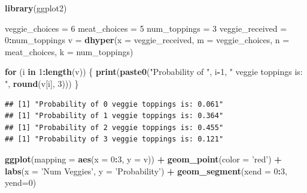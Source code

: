 \documentclass[]{book}
\newenvironment{Shaded}{\begin{snugshade}}{\end{snugshade}}
\newcommand{\KeywordTok}[1]{\textcolor[rgb]{0.13,0.29,0.53}{\textbf{#1}}}
\newcommand{\DataTypeTok}[1]{\textcolor[rgb]{0.13,0.29,0.53}{#1}}
\newcommand{\DecValTok}[1]{\textcolor[rgb]{0.00,0.00,0.81}{#1}}
\newcommand{\StringTok}[1]{\textcolor[rgb]{0.31,0.60,0.02}{#1}}
\newcommand{\ControlFlowTok}[1]{\textcolor[rgb]{0.13,0.29,0.53}{\textbf{#1}}}
\newcommand{\OperatorTok}[1]{\textcolor[rgb]{0.81,0.36,0.00}{\textbf{#1}}}
\newcommand{\NormalTok}[1]{#1}
\theoremstyle{definition}
\theoremstyle{definition}
\theoremstyle{definition}
\theoremstyle{remark}
\begin{document}
\begin{Shaded}
\begin{Highlighting}[]
\KeywordTok{library}\NormalTok{(ggplot2)}

\NormalTok{veggie_choices =}\StringTok{ }\DecValTok{6}
\NormalTok{meat_choices =}\StringTok{ }\DecValTok{5}
\NormalTok{num_toppings =}\StringTok{ }\DecValTok{3}
\NormalTok{veggie_received =}\StringTok{ }\DecValTok{0}\OperatorTok{:}\NormalTok{num_toppings}
\NormalTok{v =}\StringTok{ }\KeywordTok{dhyper}\NormalTok{(}\DataTypeTok{x =}\NormalTok{ veggie_received, }
           \DataTypeTok{m =}\NormalTok{ veggie_choices, }
           \DataTypeTok{n =}\NormalTok{ meat_choices, }
           \DataTypeTok{k =}\NormalTok{ num_toppings)}

\ControlFlowTok{for}\NormalTok{ (i }\ControlFlowTok{in} \DecValTok{1}\OperatorTok{:}\KeywordTok{length}\NormalTok{(v)) \{}
  \KeywordTok{print}\NormalTok{(}\KeywordTok{paste0}\NormalTok{(}\StringTok{"Probability of "}\NormalTok{, }
\NormalTok{               i}\OperatorTok{-}\DecValTok{1}\NormalTok{,}
               \StringTok{" veggie toppings is: "}\NormalTok{,}
               \KeywordTok{round}\NormalTok{(v[i], }\DecValTok{3}\NormalTok{)))}
\NormalTok{\}}
\end{Highlighting}
\end{Shaded}

\begin{verbatim}
## [1] "Probability of 0 veggie toppings is: 0.061"
## [1] "Probability of 1 veggie toppings is: 0.364"
## [1] "Probability of 2 veggie toppings is: 0.455"
## [1] "Probability of 3 veggie toppings is: 0.121"
\end{verbatim}

\begin{Shaded}
\begin{Highlighting}[]
\KeywordTok{ggplot}\NormalTok{(}\DataTypeTok{mapping =} \KeywordTok{aes}\NormalTok{(}\DataTypeTok{x =} \DecValTok{0}\OperatorTok{:}\DecValTok{3}\NormalTok{, }\DataTypeTok{y =}\NormalTok{ v)) }\OperatorTok{+}\StringTok{ }
\StringTok{      }\KeywordTok{geom_point}\NormalTok{(}\DataTypeTok{color =} \StringTok{'red'}\NormalTok{) }\OperatorTok{+}\StringTok{ }
\StringTok{      }\KeywordTok{labs}\NormalTok{(}\DataTypeTok{x =} \StringTok{'Num Veggies'}\NormalTok{, }\DataTypeTok{y =} \StringTok{'Probability'}\NormalTok{) }\OperatorTok{+}\StringTok{ }
\StringTok{      }\KeywordTok{geom_segment}\NormalTok{(}\DataTypeTok{xend =} \DecValTok{0}\OperatorTok{:}\DecValTok{3}\NormalTok{, }\DataTypeTok{yend=}\DecValTok{0}\NormalTok{)}
\end{Highlighting}
\end{Shaded}
\end{document}
